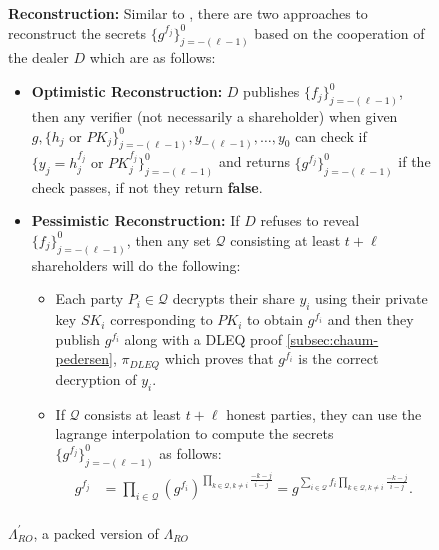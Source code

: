 \begin{figure}[ht]
{\begin{tcolorbox}[title=\textbf{$\Lambda_{RO}^{'}$}, width=1.2\textwidth, colframe=blue!75!black, colback=blue!10, sharp corners]
        \vspace{0.5em}
        \textbf{Reconstruction:}
            Similar to \cite{cryptoeprint:2025/576}, there are two approaches to reconstruct the secrets 
            $\{g^{f_j}\}_{j=-(\ell-1)}^0$ based on the cooperation of the dealer $D$ which are as follows:
            \begin{itemize}
                \item \textbf{Optimistic Reconstruction:} $D$ publishes $\{f_j\}_{j=-(\ell-1)}^0$, then any verifier (not necessarily a shareholder) 
                when given $g,\{h_j\text{ or }PK_j\}_{j=-(\ell-1)}^0,y_{-(\ell-1)},\dots,y_0$ can check if $\{y_j=h_j^{f_j}\text{ or }PK_j^{f_j}\}_{j=-(\ell-1)}^0$ 
                and returns $\{g^{f_j}\}_{j=-(\ell-1)}^0$ if the check passes, if not they return \textbf{false}.
                \item \textbf{Pessimistic Reconstruction:} If $D$ refuses to reveal $\{f_j\}_{j=-(\ell-1)}^0$, then any set 
                $\mathcal{Q}$ consisting at least $t+\ell$ shareholders will do the following:
                \begin{itemize}
                    \item Each party $P_i\in\mathcal{Q}$ decrypts their share $y_i$ using their private key $SK_i$ 
                      corresponding to $PK_i$ to obtain $g^{f_i}$ and then they publish $g^{f_i}$ 
                      along with a DLEQ proof \ref{subsec:chaum-pedersen}, $\pi_{DLEQ}$ which proves that 
                      $g^{f_i}$ is the correct decryption of $y_i$.
                    \item If $\mathcal{Q}$ consists at least $t+\ell$ honest parties, they can use the 
                    lagrange interpolation to compute the secrets $\{g^{f_j}\}_{j=-(\ell-1)}^0$ as follows:
                    \begin{align*}
                        g^{f_j} &= \prod_{i\in\mathcal{Q}}(g^{f_i})^{\prod_{k\in\mathcal{Q},k\neq i}\frac{-k-j}{i-j}}= g^{\sum_{i\in\mathcal{Q}}f_i\prod_{k\in\mathcal{Q},k\neq i}\frac{-k-j}{i-j}}.\\
                    \end{align*}
                \end{itemize}
            \end{itemize}
    \end{tcolorbox}
    }
    \caption[PPPVSS]{$\Lambda_{RO}^{'}$, a packed version of $\Lambda_{RO}$ \cite{cryptoeprint:2025/576}}
    \label{fig:initial-packed-shamir-PPPVSS-ro}
\end{figure}